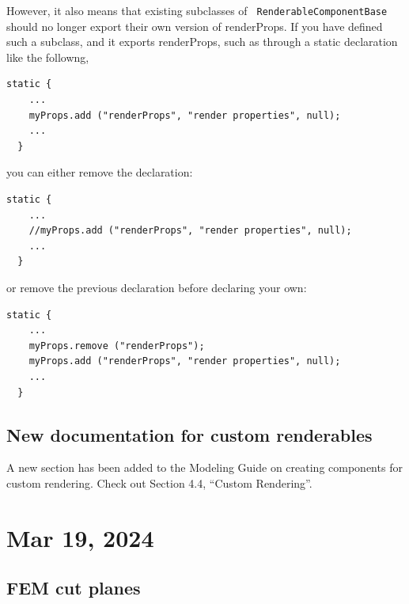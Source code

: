 \documentclass{article}
\begin{document}
However, it also means that existing subclasses of {\tt
RenderableComponentBase} should no longer export their own version of
{\sf renderProps}. If you have defined such a subclass, and it exports
{\sf renderProps}, such as through a static declaration like the
followng,
%
\begin{lstlisting}[]
  static {
    ...
    myProps.add ("renderProps", "render properties", null);
    ... 
  }
\end{lstlisting}
%
you can either remove the declaration:
%
\begin{lstlisting}[]
  static {
    ...
    //myProps.add ("renderProps", "render properties", null);
    ... 
  }
\end{lstlisting}
%
or remove the previous declaration before declaring your own:
%
\begin{lstlisting}[]
  static {
    ...
    myProps.remove ("renderProps");
    myProps.add ("renderProps", "render properties", null);
    ... 
  }
\end{lstlisting}
%

\subsection*{New documentation for custom renderables}

A new section has been added to the Modeling Guide on creating
components for custom rendering. Check out Section 4.4, ``Custom
Rendering''.

\section*{Mar 19, 2024}

\subsection*{FEM cut planes}
\end{document}
